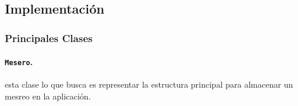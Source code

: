 \subsection*{Implementación}


\subsubsection*{Principales Clases}

\paragraph{\texttt{Mesero}.} esta clase lo que busca es representar la estructura principal para almacenar un mesreo en la aplicación.